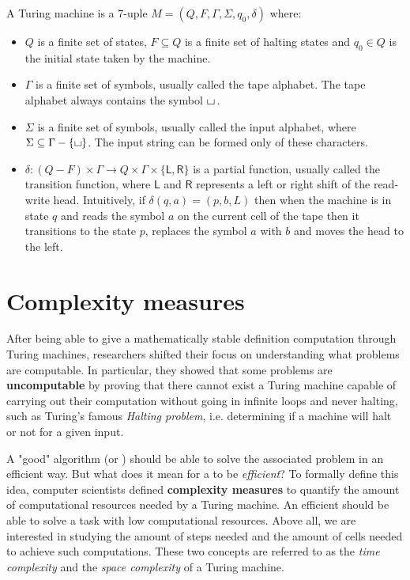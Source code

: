\begin{definition}
    A Turing machine is a 7-uple $M = (Q, F, \Gamma, \Sigma, q_0, \delta)$ where:
    \begin{itemize}
        \item $Q$ is a finite set of states, $F \subseteq Q$ is a finite set of halting states and $q_0 \in Q$ is the initial state taken by the machine.
        \item $\Gamma$ is a finite set of symbols, usually called the tape alphabet. The tape alphabet always contains the symbol $\blankchar\,$.
        \item $\Sigma$ is a finite set of symbols, usually called the input alphabet, where $\Sigma \subseteq \Gamma - \{\blankchar\}$. The input string can be formed only of these characters.
        \item $\delta : (Q - F) \times \Gamma \to Q \times \Gamma \times \{\mathsf{L}, \mathsf{R}\}$ is a partial function, usually called the transition function, where $\mathsf{L}$ and $\mathsf{R}$ represents a left or right shift of the read-write head. Intuitively, if $\delta(q, a) = (p, b, L)$ then when the machine is in state $q$ and reads the symbol $a$ on the current cell of the tape then it transitions to the state $p$, replaces the symbol $a$ with $b$ and moves the head to the left.
    \end{itemize}
\end{definition}


\newpage

\section{Complexity measures}

After being able to give a mathematically stable definition computation through Turing machines, researchers shifted their focus on understanding what problems are computable. In particular, they showed that some problems are \textbf{uncomputable} by proving that there cannot exist a Turing machine capable of carrying out their computation without going in infinite loops and never halting, such as Turing's famous \textit{Halting problem}, i.e. determining if a machine will halt or not for a given input.

A "good" algorithm (or \TM) should be able to solve the associated problem in an efficient way. But what does it mean for a \TM to be \textit{efficient}? To formally define this idea, computer scientists  defined \textbf{complexity measures} to quantify the amount of computational resources needed by a Turing machine. An efficient \TM should be able to solve a task with low computational resources. Above all, we are interested in studying the amount of steps needed and the amount of cells needed to achieve such computations. These two concepts are referred to as the \textit{time complexity} and the \textit{space complexity} of a Turing machine.

